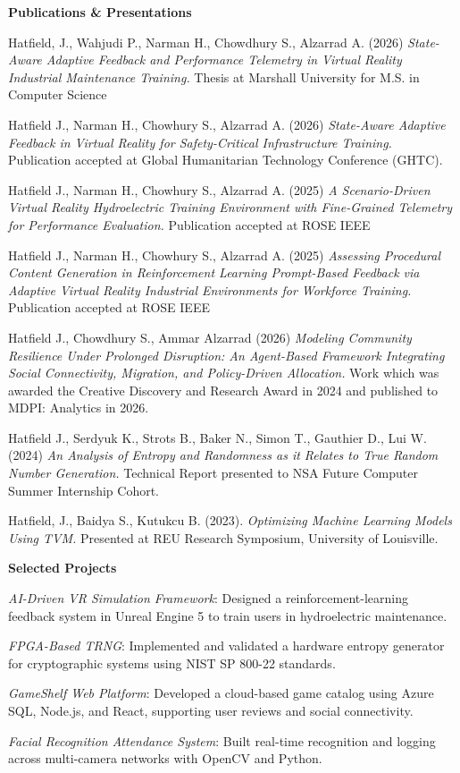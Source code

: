 \documentclass[11pt,letterpaper]{article}
\newcommand{\cvsection}[1]{%
  \par{\fontsize{12bp}{13.9bp}\selectfont
    \leavevmode\rlap{\rule[-1.05bp]{\linewidth}{0.45bp}}\textbf{#1}\par}%
  \nopagebreak[4]%
}
\newcommand{\cvpublication}[3]{#1 #2 #3\par}
\newcommand{\cvproject}[2]{\textit{#1}: #2\par}
\newenvironment{cvindented}{\par\begingroup\leftskip=36bp}{\par\endgroup}
\begin{document}
\cvsection{Publications \& Presentations}
\begin{cvindented}
\cvpublication{Hatfield, J., Wahjudi P., Narman H., Chowdhury S., Alzarrad A. (2026)}{{\fontsize{12bp}{13.9bp}\selectfont\textit{State-Aware Adaptive Feedback and Performance Telemetry in Virtual Reality Industrial Maintenance Training}}\textit{.}}{Thesis at Marshall University for M.S. in Computer Science}

\cvpublication{Hatfield J., Narman H., Chowhury S., Alzarrad A. (2026)}{\textit{State-Aware Adaptive Feedback in Virtual Reality for Safety-Critical Infrastructure Training.}}{Publication accepted at Global Humanitarian Technology Conference (GHTC).}

\cvpublication{Hatfield J., Narman H., Chowhury S., Alzarrad A. (2025)}{\textit{A Scenario-Driven Virtual Reality Hydroelectric Training Environment with Fine-Grained Telemetry for Performance Evaluation.}}{Publication accepted at ROSE IEEE}

\cvpublication{Hatfield J., Narman H., Chowhury S., Alzarrad A. (2025)}{\textit{Assessing Procedural Content Generation in Reinforcement Learning Prompt-Based Feedback via Adaptive Virtual Reality Industrial Environments for Workforce Training.}}{Publication accepted at ROSE IEEE}

\cvpublication{Hatfield J., Chowdhury S., Ammar Alzarrad (2026)}{\textit{Modeling Community Resilience Under Prolonged Disruption: An Agent-Based Framework Integrating Social Connectivity, Migration, and Policy-Driven Allocation.}}{Work which was awarded the Creative Discovery and Research Award in 2024 and published to MDPI: Analytics in 2026.}
\par\vspace{-6bp}
\cvpublication{Hatfield J., Serdyuk K., Strots B., Baker N., Simon T., Gauthier D., Lui W. (2024)}{\textit{An Analysis of Entropy and Randomness as it Relates to True Random Number Generation.}}{Technical Report presented to NSA Future Computer Summer Internship Cohort.}

\cvpublication{Hatfield, J., Baidya S., Kutukcu B. (2023).}{\textit{Optimizing Machine Learning Models Using TVM.}}{Presented at REU Research Symposium, University of Louisville.}
\end{cvindented}

\cvsection{Selected Projects}
\begin{cvindented}
\cvproject{AI-Driven VR Simulation Framework}{Designed a reinforcement-learning feedback system in Unreal Engine 5 to train users in hydroelectric maintenance.}

\cvproject{FPGA-Based TRNG}{Implemented and validated a hardware entropy generator for cryptographic systems using NIST SP 800-22 standards.}

\cvproject{GameShelf Web Platform}{Developed a cloud-based game catalog using Azure SQL, Node.js, and React, supporting user reviews and social connectivity.}

\cvproject{Facial Recognition Attendance System}{Built real-time recognition and logging across multi-camera networks with OpenCV and Python.}
\end{cvindented}
\end{document}

